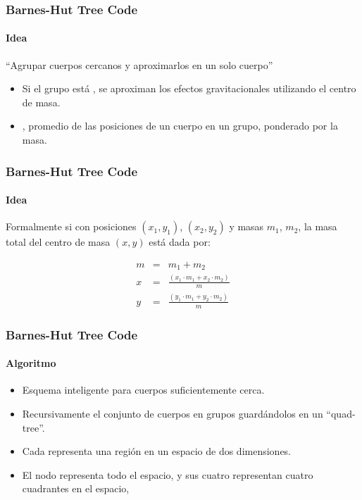 \frame
{
\frametitle{Barnes-Hut Tree Code}
\framesubtitle{Idea}

\begin{center}
``Agrupar cuerpos cercanos y aproximarlos en un solo cuerpo''
\end{center}

\begin{itemize}
	\item Si el grupo está , se aproximan los efectos gravitacionales
		 utilizando el centro de masa.
	\item {}, promedio de las posiciones de un cuerpo en un grupo,
		 ponderado por la masa.
\end{itemize}
}

\frame
{
\frametitle{Barnes-Hut Tree Code}
\framesubtitle{Idea}


\begin{center}
Formalmente si  con posiciones $(x_{1},y_{1})$, $(x_{2},y_{2})$ y
masas $m_{1}$, $m_{2}$, la masa total del centro de masa $(x,y)$ está dada por:
\end{center}

\begin{eqnarray}
	m &=& m_{1} + m_{2} \nonumber \\
	x &=& \frac{(x_{1}\cdot m_{1} + x_{2}\cdot m_{2})}{m} \nonumber \\
	y &=& \frac{(y_{1}\cdot m_{1} + y_{2}\cdot m_{2})}{m} \nonumber 
\end{eqnarray}

}

\frame
{
\frametitle{Barnes-Hut Tree Code}
\framesubtitle{Algoritmo}

\begin{itemize}
	\item Esquema inteligente para  cuerpos suficientemente cerca.
	\item Recursivamente  el conjunto de cuerpos en grupos
		guardándolos en un ``quad-tree''.
	\item Cada  representa una región en un espacio de dos dimensiones.
	\item El nodo  representa todo el espacio,
		y sus cuatro  representan cuatro cuadrantes en el espacio,
\end{itemize}
}

